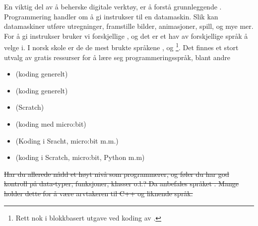 




En viktig del av å beherske digitale verktøy, er å forstå grunnleggende .	
Programmering handler om å gi instrukser til en datamaskin. Slik kan datamaskiner utføre utregninger, framstille bilder, animasjoner, spill, og mye mer. For å gi instrukser bruker vi forskjellige , og det er et hav av forskjellige språk å velge i. I norsk skole er de de mest brukte språkene ,  og \footnote{Rett nok i blokkbasert utgave ved koding av .}. Det finnes et stort utvalg av gratis ressurser for å lære seg programmeringsspråk, blant andre
\begin{itemize}
	\item {} (koding generelt)
	\item {} (koding generelt)
	\item {} (Scratch)
	\item {} (koding med micro:bit)
	\item {} (Koding i Sracht, micro:bit m.m.)
	\item {} (koding i Scratch, micro:bit, Python m.m)
\end{itemize} \vsk

\st{Har du allerede nådd et høyt nivå som programmerer, og føler du har god kontroll på data-typer, funksjoner, klasser o.l.? Da anbefales språket . Mange holder dette for å være arvtakeren til C++ og liknende språk.}



